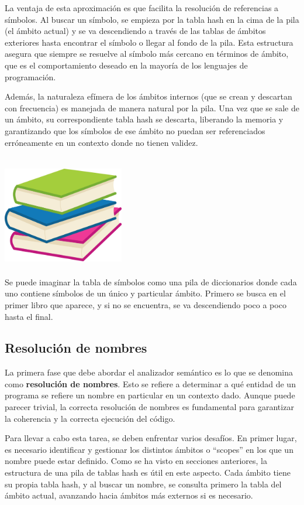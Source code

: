 La ventaja de esta aproximación es que facilita la resolución de referencias a símbolos. Al buscar un símbolo, se empieza por la tabla hash en la cima de la pila (el ámbito actual) y se va descendiendo a través de las tablas de ámbitos exteriores hasta encontrar el símbolo o llegar al fondo de la pila. Esta estructura asegura que siempre se resuelve al símbolo más cercano en términos de ámbito, que es el comportamiento deseado en la mayoría de los lenguajes de programación.

Además, la naturaleza efímera de los ámbitos internos (que se crean y descartan con frecuencia) es manejada de manera natural por la pila. Una vez que se sale de un ámbito, su correspondiente tabla hash se descarta, liberando la memoria y garantizando que los símbolos de ese ámbito no puedan ser referenciados erróneamente en un contexto donde no tienen validez.

{
\centering
\includegraphics[width=200px, height=200px]{images/implementacion/semantic/scope_stack.png}\\
}
Se puede imaginar la tabla de símbolos como una pila de diccionarios donde cada uno contiene símbolos de un único y particular ámbito. Primero se busca en el primer libro que aparece, y si no se encuentra, se va descendiendo poco a poco hasta el final.

\subsection{Resolución de nombres}
La primera fase que debe abordar el analizador semántico es lo que se denomina como \textbf{resolución de nombres}. Esto se refiere a determinar a qué entidad de un programa se refiere un nombre en particular en un contexto dado. Aunque puede parecer trivial, la correcta resolución de nombres es fundamental para garantizar la coherencia y la correcta ejecución del código. 



Para llevar a cabo esta tarea, se deben enfrentar varios desafíos. En primer lugar, es necesario identificar y gestionar los distintos ámbitos o ``scopes'' en los que un nombre puede estar definido. Como se ha visto en secciones anteriores, la estructura de una pila de tablas hash es útil en este aspecto. Cada ámbito tiene su propia tabla hash, y al buscar un nombre, se consulta primero la tabla del ámbito actual, avanzando hacia ámbitos más externos si es necesario.


